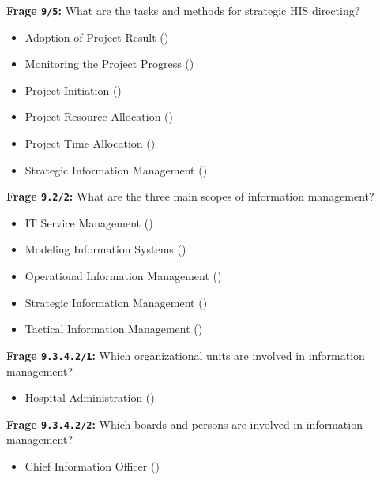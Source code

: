 \textbf{Frage \texttt{9/5}:} What are the tasks and methods for strategic HIS directing?

\begin{itemize}
  \item Adoption of Project Result ()
  \item Monitoring the Project Progress ()
  \item Project Initiation ()
  \item Project Resource Allocation ()
  \item Project Time Allocation ()
  \item Strategic Information Management ()
\end{itemize}

\textbf{Frage \texttt{9.2/2}:} What are the three main scopes of information management?

\begin{itemize}
  \item IT Service Management ()
  \item Modeling Information Systems ()
  \item Operational Information Management ()
  \item Strategic Information Management ()
  \item Tactical Information Management ()
\end{itemize}

\textbf{Frage \texttt{9.3.4.2/1}:} Which organizational units are involved in information management?

\begin{itemize}
  \item Hospital Administration ()
\end{itemize}

\textbf{Frage \texttt{9.3.4.2/2}:} Which boards and persons are involved in information management?

\begin{itemize}
  \item Chief Information Officer ()
\end{itemize}


